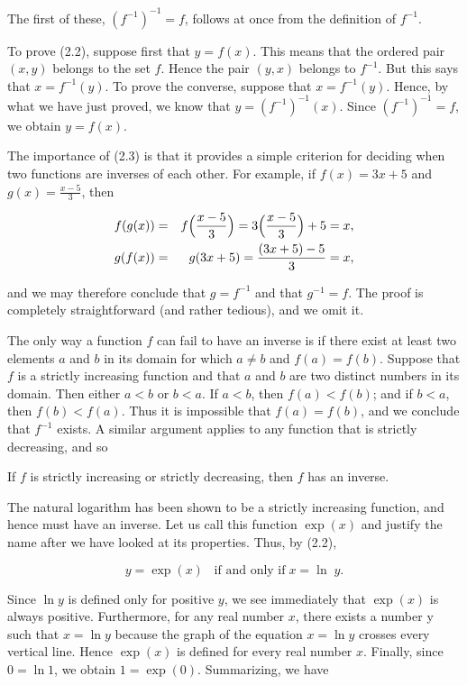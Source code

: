 The first of these, $(f^{-1})^{-1} = f$, follows at once from the definition of $f^{-1}$.

To prove (2.2), suppose first that $y = f (x)$. This means that the ordered pair $(x, y)$ belongs to the set $f$. Hence the pair $(y, x)$ belongs to $f^{-1}$. But this says that $x = f^{-1}(y)$. To prove the converse, suppose that $x = f^{-1}(y)$. Hence, by what we have just proved, we know that $y = (f^{-1})^{-1}(x)$. Since $(f^{-1})^{-1} = f$, we obtain $y = f (x)$.

The importance of (2.3) is that it provides a simple criterion for deciding when two functions are inverses of each other. For example, if $f(x) = 3x + 5$ and $g(x) = \frac{x - 5}{3}$, then

\begin{eqnarray*}
f(g(x)) &=& f \Bigl( \frac{x - 5}{3} \Bigr) = 3 \Bigl(\frac{x - 5}{3} \Bigr) + 5 = x, \\
g(f(x)) &=& g(3x + 5) = \frac{(3x + 5) - 5}{3} = x,
\end{eqnarray*}

\noindent and we may therefore conclude that $g = f^{-1}$ and that $g^{-1} = f$. The proof is completely straightforward (and rather tedious), and we omit it.

The only way a function $f$ can fail to have an inverse is if there exist at least two elements $a$ and $b$ in its domain for which $a \neq b$ and $f(a) = f(b)$. Suppose that $f$ is a strictly increasing function and that $a$ and $b$ are two distinct numbers in its domain. Then either $a < b$ or $b < a$. If $a < b$, then $f(a) < f(b)$; and if $b < a$, then $f(b) < f(a)$. Thus it is impossible that $f(a) = f(b)$, and we conclude that $f^{-1}$ exists. A similar argument applies to any function that is strictly decreasing,
and so

\begin{theorem} %
If $f$ is strictly increasing or strictly decreasing, then $f$ has an inverse.
\end{theorem}

The natural logarithm has been shown to be a strictly increasing function, and hence must have an inverse. Let us call this function $\exp (x)$ and justify the name after we have looked at its properties. Thus, by (2.2),

$$
y = \exp (x) \;\;\; \mbox{if and only if}\; x = \ln\; y. 
$$

Since $\ln y$ is defined only for positive $y$, we see immediately that $\exp(x)$ is always positive. Furthermore, for any real number $x$, there exists a number y such that $x = \ln y$ because the graph of the equation $x = \ln y$ crosses every vertical line. Hence $\exp (x)$ is defined for every real number $x$. Finally, since $0 = \ln 1$, we obtain $1 = \exp(0)$. Summarizing, we have
  
